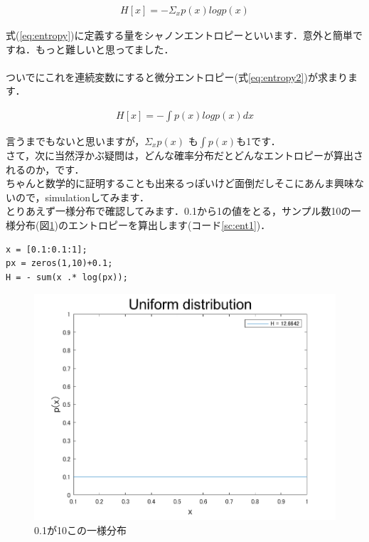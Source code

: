 \documentclass[11pt,a4paper]{jsarticle}                    %
\begin{document}
\begin{eqnarray}
\label{eq:entropy}
H[x] = - \Sigma_{x} p(x) log p(x)
\end{eqnarray}

式(\ref{eq:entropy})に定義する量をシャノンエントロピーといいます\cite{prml}．意外と簡単ですね．もっと難しいと思ってました．\\
\\
ついでにこれを連続変数にすると微分エントロピー(式\ref{eq:entropy2})が求まります．

\begin{eqnarray}
\label{eq:entropy2}
H[x] = - \int p(x) log p(x) dx
\end{eqnarray}

言うまでもないと思いますが，$ \Sigma_{x} p(x)$ も$ \int p(x)$も1です．\\
さて，次に当然浮かぶ疑問は，どんな確率分布だとどんなエントロピーが算出されるのか，です．\\
ちゃんと数学的に証明することも出来るっぽいけど面倒だしそこにあんま興味ないので，simulationしてみます．\\

とりあえず一様分布で確認してみます．0.1から1の値をとる，サンプル数10の一様分布(図\ref{im:ent1})のエントロピーを算出します(コード\ref{sc:ent1})．
\begin{lstlisting}[caption=エントロピーの計算,label=sc:ent1]
x = [0.1:0.1:1];
px = zeros(1,10)+0.1;
H = - sum(x .* log(px));

\end{lstlisting}

\begin{figure}[H]
\label{im:ent1}
  \centering
  \includegraphics[width=200mm, bb=0 0 600 400]{../figures/dis_entropy1.png}
  \caption{0.1が10この一様分布}
\end{figure}
\end{document}
